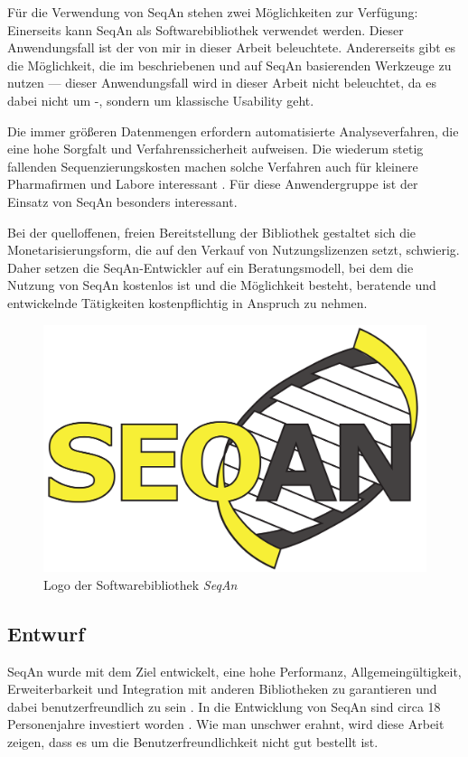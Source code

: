 \bigskip

Für die Verwendung von SeqAn stehen zwei Möglichkeiten zur Verfügung: Einerseits kann SeqAn als Softwarebibliothek verwendet werden. Dieser Anwendungsfall ist der von mir in dieser Arbeit beleuchtete. Andererseits gibt es die Möglichkeit, die im  beschriebenen und auf SeqAn basierenden Werkzeuge zu nutzen --- dieser Anwendungsfall wird in dieser Arbeit nicht beleuchtet, da es dabei nicht um -, sondern um klassische Usability geht.

Die immer größeren Datenmengen erfordern automatisierte Analyseverfahren, die eine hohe Sorgfalt und Verfahrenssicherheit aufweisen. Die wiederum stetig fallenden Sequenzierungskosten machen solche Verfahren auch für kleinere Pharmafirmen und Labore interessant \citep{Reinert:tg}. Für diese Anwendergruppe ist der Einsatz von SeqAn besonders interessant.

Bei der quelloffenen, freien Bereitstellung der Bibliothek gestaltet sich die Monetarisierungsform, die auf den Verkauf von Nutzungslizenzen setzt, schwierig. Daher setzen die SeqAn-Entwickler auf ein Beratungsmodell, bei dem die Nutzung von SeqAn kostenlos ist und die Möglichkeit besteht, beratende und entwickelnde Tätigkeiten kostenpflichtig in Anspruch zu nehmen.
 
\begin{figure}
  \centering
    \includegraphics[width=0.35\linewidth]{Figures/seqan-logo.png}
  \caption[SeqAn-Logo]{Logo der Softwarebibliothek \textit{SeqAn}}
  \label{fig:seqan-logo}
\end{figure}


\subsection{Entwurf}
\label{sec:seqan-entwurf}

SeqAn wurde mit dem Ziel entwickelt, eine hohe Performanz, Allgemeingültigkeit, Erweiterbarkeit und Integration mit anderen Bibliotheken zu garantieren und dabei benutzerfreundlich zu sein \citep{GogolDoring:2009vz,gogol2009biological}. In die Entwicklung von SeqAn sind circa 18 Personenjahre investiert worden \citep{Reinert:tg}. Wie man unschwer erahnt, wird diese Arbeit zeigen, dass es um die Benutzerfreundlichkeit nicht gut bestellt ist.

